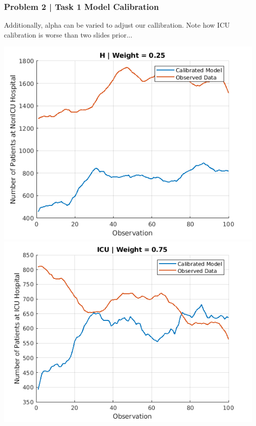 \documentclass[aspectratio=1610]{beamer}
\begin{document}
\begin{frame}
\frametitle{Problem 2 | Task 1 Model Calibration}

Additionally, alpha can be varied to adjust our callibration. Note how ICU calibration is worse than two slides prior...

\vspace{1em}

\centering
\includegraphics[width = .45\textwidth]{H_alph25_30}
\includegraphics[width = .45\textwidth]{ICU_alph25_30}

\end{frame}
\end{document}
